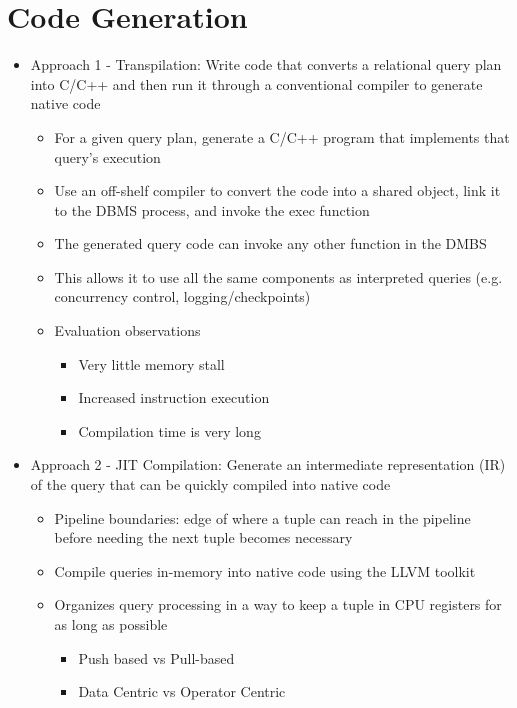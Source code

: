 \documentclass[11pt]{article}
\begin{document}
\section{Code Generation}
\begin{itemize}
    \item Approach 1 - Transpilation: Write code that converts a relational query plan into C/C++ and then run it through a conventional compiler to generate native code
    \begin{itemize}
        \item For a given query plan, generate a C/C++ program that implements that query's execution
        \item Use an off-shelf compiler to convert the code into a shared object, link it to the DBMS process, and invoke the exec function
        \item The generated query code can invoke any other function in the DMBS
        \item This allows it to use all the same components as interpreted queries (e.g. concurrency control, logging/checkpoints)
        \item Evaluation observations
        \begin{itemize}
            \item Very little memory stall
            \item Increased instruction execution
            \item Compilation time is very long
        \end{itemize}
    \end{itemize}
    \item Approach 2 - JIT Compilation: Generate an intermediate representation (IR) of the query that can be quickly compiled into native code
    \begin{itemize}
        \item Pipeline boundaries: edge of where a tuple can reach in the pipeline before needing the next tuple becomes necessary
        \item Compile queries in-memory into native code using the LLVM toolkit
        \item Organizes query processing in a way to keep a tuple in CPU registers for as long as possible
        \begin{itemize}
            \item Push based vs Pull-based
            \item Data Centric vs Operator Centric
        \end{itemize}

\end{itemize}
\end{itemize}
\end{document}
